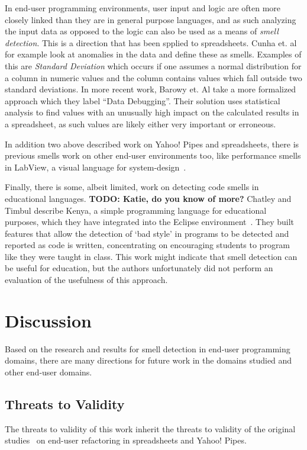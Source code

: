 \documentclass{sig-alternate}
\newcommand{\todo}[1]{\textbf{TODO: #1}}
\begin{document}
In end-user programming environments, user input and logic are often more closely linked than they are in general purpose languages, and as such analyzing the input data as opposed to the logic can also be used as a means of \emph{smell detection}. This is a direction that has been spplied to spreadsheets. Cunha et. al \cite{cunha2012towards} for example look at anomalies in the data and define these as smells. Examples of this are \textit{Standard Deviation} which occurs if one assumes a normal distribution for a column in numeric values and the column contains values which fall outside two standard deviations. In more recent work, Barowy et. Al \cite{barowy2014checkcell} take a more formalized approach which they label ``Data Debugging''. Their solution uses statistical analysis to find values with an unusually high impact on the calculated results in a spreadsheet, as such values are likely either very important or erroneous.

In addition two above described work on Yahoo! Pipes and spreadsheets, there is previous smells work on other end-user environments too, like performance smells in LabView, a visual language for system-design~\cite{chambers2013smell, chambers2015impact}. 

Finally, there is some, albeit limited, work on detecting code smells in educational languages. \todo{Katie, do you know of more?} Chatley and Timbul describe Kenya, a simple programming language for educational purposes, which they have integrated into the Eclipse environment~\cite{Chatley2005}. They built features that allow the detection of `bad style' in programs to be detected and reported as code is written, concentrating on encouraging students to program like they were taught in class. This work might indicate that smell detection can be useful for education, but the authors unfortunately did not perform an evaluation of the usefulness of this approach.



\section{Discussion}
\label{sec:discussion}

Based on the research and results for smell detection in end-user programming domains, there are many directions for future work in the domains studied and other end-user domains.





\subsection{Threats to Validity}
The threats to validity of this work inherit the threats to validity of the original studies~\cite{Stolee2015, Stolee2011, StoleeTSE2013, Hermans2011, Hermans2012intra, Hermans2012inter, hermans2014bumblebee, badame2012refactoring} on end-user refactoring in spreadsheets and Yahoo! Pipes.
\end{document}
